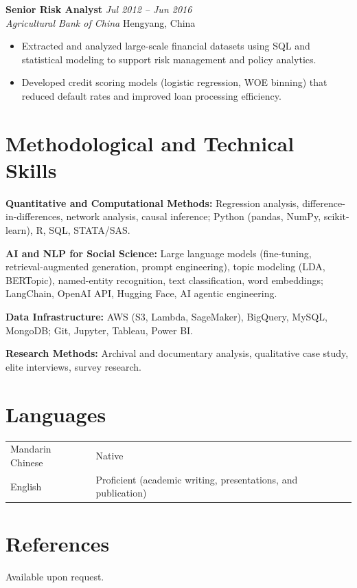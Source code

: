 \documentclass[11pt, letterpaper]{article}
\begin{document}
\vspace{6pt}
\noindent\textbf{Senior Risk Analyst}
\hfill \textit{Jul 2012 -- Jun 2016}\\
\textit{Agricultural Bank of China} \hfill Hengyang, China
\begin{itemize}
  \item Extracted and analyzed large-scale financial datasets using SQL and
        statistical modeling to support risk management and policy analytics.
  \item Developed credit scoring models (logistic regression, WOE binning)
        that reduced default rates and improved loan processing efficiency.
\end{itemize}

\section{Methodological and Technical Skills}

\noindent\textbf{Quantitative and Computational Methods:}
Regression analysis, difference-in-differences, network analysis,
causal inference; Python (pandas, NumPy, scikit-learn), R, SQL, STATA/SAS.

\noindent\textbf{AI and NLP for Social Science:}
Large language models (fine-tuning, retrieval-augmented generation,
prompt engineering), topic modeling (LDA, BERTopic), named-entity recognition,
text classification, word embeddings; LangChain, OpenAI API, Hugging Face, AI agentic engineering.

\noindent\textbf{Data Infrastructure:}
AWS (S3, Lambda, SageMaker), BigQuery, MySQL, MongoDB; Git, Jupyter,
Tableau, Power BI.

\noindent\textbf{Research Methods:}
Archival and documentary analysis, qualitative case study, elite
interviews, survey research.

\section{Languages}

\begin{tabular}{@{}ll}
  Mandarin Chinese & Native \\
  English          & Proficient (academic writing, presentations, and publication) \\
\end{tabular}

\section{References}

Available upon request.
\end{document}
